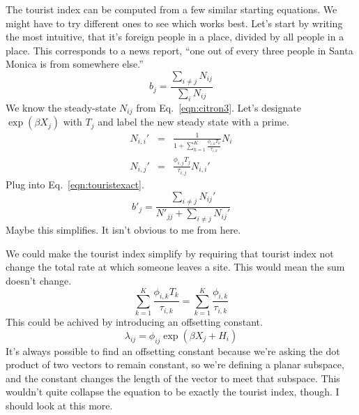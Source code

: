 \documentclass{article}
\begin{document}
The tourist index can be computed from a few similar starting equations. We might have to try different ones to see which works best. Let's start by writing the most intuitive, that it's foreign people in a place, divided by all people in a place. This corresponds to a news report, ``one out of every three people in Santa Monica is from somewhere else.''
\begin{equation}
 b_j = \frac{\sum_{i\ne j} N_{ij}}{\sum_i N_{ij}}\label{eqn:touristexact}
\end{equation}
We know the steady-state $N_{ij}$ from Eq.~\ref{eqn:citron3}. Let's designate $\exp\left(\beta X_{j}\right)$ with $T_j$ and label the new steady state with a prime.
\begin{eqnarray}
N_{i,i}' & = & \frac{1}{1+\sum_{k=1}^K\frac{\phi_{i,k}T_k}{\tau_{i,k}}}N_i \\
N_{i,j}' & = & \frac{\phi_{i,j}T_j}{\tau_{i,j}} N_{i,i}'\label{eqn:touriststable}
\end{eqnarray}
Plug into Eq.~\ref{eqn:touristexact}.
\begin{equation}
b'_j = \frac{\sum_{i\ne j}N_{ij}'}{N'_{jj}+\sum_{i\ne j} N_{ij}'}
\end{equation}
Maybe this simplifies. It isn't obvious to me from here.

We could make the tourist index simplify by requiring that tourist index not change the total rate at which someone leaves a site. This would mean the sum doesn't change.
\begin{equation}
\sum_{k=1}^K\frac{\phi_{i,k}T_k}{\tau_{i,k}} = \sum_{k=1}^K\frac{\phi_{i,k}}{\tau_{i,k}}
\end{equation}
This could be achived by introducing an offsetting constant.
\begin{equation}
  \lambda_{ij} = \phi_{ij}\exp\left(\beta X_{j} + H_i\right)
\end{equation}
It's always possible to find an offsetting constant because we're asking the dot product of two vectors to remain constant, so we're defining a planar subspace, and the constant changes the length of the vector to meet that subspace. This wouldn't quite collapse the equation to be exactly the tourist index, though. I should look at this more.
\end{document}

